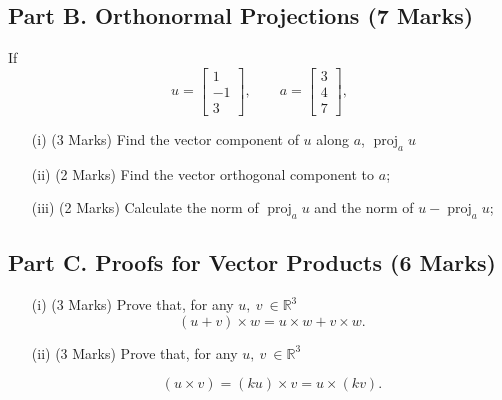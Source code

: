 \documentclass[a4paper,12pt]{article}
\begin{document}
\subsection*{Part B. Orthonormal Projections (7 Marks)}
%	
If
\begin{equation*}
u =\left[ \begin{array}{c} 1 \\ -1 \\ 3 \end{array}\right],\qquad 
a =\left[ \begin{array}{c} 3 \\ 4 \\ 7 \end{array}\right],
\end{equation*}

\begin{itemize}
	\item[(i)](3 Marks) Find the vector component of $u$ along $a$, $\operatorname{proj}_{a}u$ 
	\item[(ii)](2 Marks) Find the
	vector orthogonal component to $a$;
	
	\item[(iii)](2 Marks) Calculate the norm of $\operatorname{proj}_a u$ and the norm of $u-\operatorname{proj}_a u$;
	
\end{itemize}
	\smallskip
	\subsection*{Part C. Proofs for Vector Products (6 Marks)}
	
	\begin{itemize}
		
		\item[(i)] (3 Marks) Prove that, for any $u,\:v\:\in\mathbb{R}^3$\[(u+v)\times w=u\times w + v\times w.\]
		
			\item[(ii)] (3 Marks) Prove that, for any $u,\:v\:\in\mathbb{R}^3$
			
			\[(u\times v)=(ku)\times v = u\times (kv).\]
	\end{itemize} \vspace{0.4cm}
\end{document}
